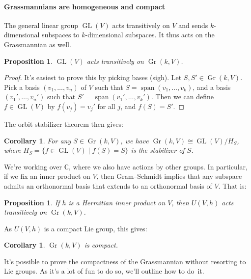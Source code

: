 \documentclass[10pt,a4paper]{article}
\newtheorem{prop}[theo]{Proposition}
\newtheorem{coro}[theo]{Corollary}
\newtheorem*{proof}{Proof}
\newcommand{\kk}[1]{\mathbb{#1}}
\DeclareMathOperator{\Span}{span}
\DeclareMathOperator{\Gr}{Gr}
\DeclareMathOperator{\GL}{GL}
\begin{document}
\paragraph{Grassmannians are homogeneous and compact}

The general linear group $\GL(V)$ acts transitively on $V$ and sends $k$-dimensional subspaces to $k$-dimen\-sional subspaces. It thus acts on the Grassmannian as well.

\begin{prop}
$\GL(V)$ acts transitively on $\Gr(k,V)$.
\end{prop}

\begin{proof}
It's easiest to prove this by picking bases (sigh). Let $S,S' \in \Gr(k, V)$. Pick a basis $(v_1,\ldots,v_n)$ of $V$ such that $S = \Span(v_1,\ldots,v_k)$, and a basis $(v_1', \ldots, v_n')$ such that $S' = \Span(v_1', \ldots, v_k')$. Then we can define $f \in \GL(V)$ by $f(v_j) = v_j'$ for all $j$, and $f(S) = S'$.
\end{proof}

The orbit-stabilizer theorem then gives:

\begin{coro}
For any $S \in \Gr(k, V)$, we have $\Gr(k, V) \cong \GL(V) / H_S$, where $H_S = \{ f \in \GL(V) \mid f(S) = S \}$ is the stabilizer of $S$.
\end{coro}

We're working over $\kk C$, where we also have actions by other groups. In particular, if we fix an inner product on $V$, then Gram--Schmidt implies that any subspace admits an orthonormal basis that extends to an orthonormal basis of $V$. That is:

\begin{prop}
If $h$ is a Hermitian inner product on $V$, then $U(V,h)$ acts transitively on $\Gr(k, V)$.
\end{prop}

As $U(V,h)$ is a compact Lie group, this gives:

\begin{coro}
\label{coro:grassmannian-is-compact}
$\Gr(k, V)$ is compact.
\end{coro}

It's possible to prove the compactness of the Grassmannian without resorting to Lie groups. As it's a lot of fun to do so, we'll outline how to do~it.%
\end{document}
